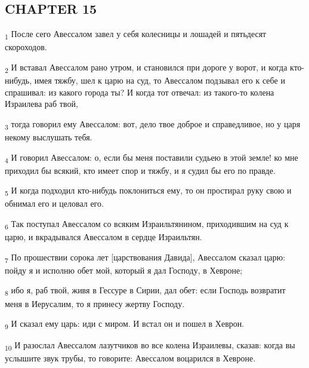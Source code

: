 \subsection{CHAPTER 15}
\begin{tcolorbox}
\textsubscript{1} После сего Авессалом завел у себя колесницы и лошадей и пятьдесят скороходов.
\end{tcolorbox}
\begin{tcolorbox}
\textsubscript{2} И вставал Авессалом рано утром, и становился при дороге у ворот, и когда кто-нибудь, имея тяжбу, шел к царю на суд, то Авессалом подзывал его к себе и спрашивал: из какого города ты? И когда тот отвечал: из такого-то колена Израилева раб твой,
\end{tcolorbox}
\begin{tcolorbox}
\textsubscript{3} тогда говорил ему Авессалом: вот, дело твое доброе и справедливое, но у царя некому выслушать тебя.
\end{tcolorbox}
\begin{tcolorbox}
\textsubscript{4} И говорил Авессалом: о, если бы меня поставили судьею в этой земле! ко мне приходил бы всякий, кто имеет спор и тяжбу, и я судил бы его по правде.
\end{tcolorbox}
\begin{tcolorbox}
\textsubscript{5} И когда подходил кто-нибудь поклониться ему, то он простирал руку свою и обнимал его и целовал его.
\end{tcolorbox}
\begin{tcolorbox}
\textsubscript{6} Так поступал Авессалом со всяким Израильтянином, приходившим на суд к царю, и вкрадывался Авессалом в сердце Израильтян.
\end{tcolorbox}
\begin{tcolorbox}
\textsubscript{7} По прошествии сорока лет [царствования Давида], Авессалом сказал царю: пойду я и исполню обет мой, который я дал Господу, в Хевроне;
\end{tcolorbox}
\begin{tcolorbox}
\textsubscript{8} ибо я, раб твой, живя в Гессуре в Сирии, дал обет: если Господь возвратит меня в Иерусалим, то я принесу жертву Господу.
\end{tcolorbox}
\begin{tcolorbox}
\textsubscript{9} И сказал ему царь: иди с миром. И встал он и пошел в Хеврон.
\end{tcolorbox}
\begin{tcolorbox}
\textsubscript{10} И разослал Авессалом лазутчиков во все колена Израилевы, сказав: когда вы услышите звук трубы, то говорите: Авессалом воцарился в Хевроне.
\end{tcolorbox}
